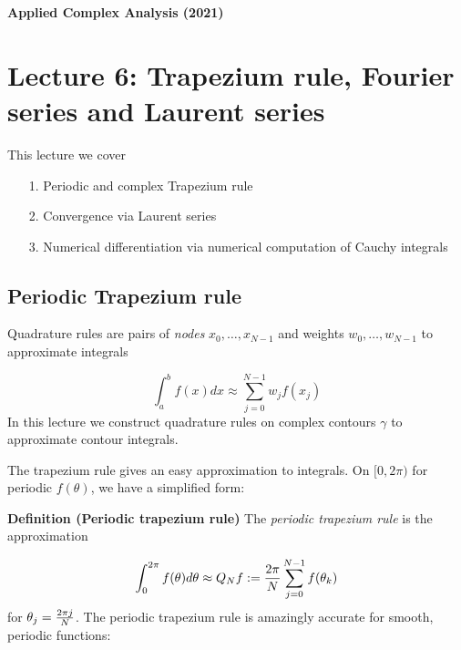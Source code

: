 \documentclass[12pt,landscape]{article}
\begin{document}
{\LARGE
\sf
\textbf{Applied Complex Analysis (2021)}

\section{Lecture 6: Trapezium rule, Fourier series and Laurent series}
This lecture we cover

\begin{itemize}
\item[1. ] Periodic and complex Trapezium rule


\item[2. ] Convergence via Laurent series


\item[3. ] Numerical differentiation via numerical computation of Cauchy integrals

\end{itemize}
\newpage
\subsection{Periodic Trapezium rule}
Quadrature rules are pairs of \emph{nodes} $x_0,\ldots,x_{N-1}$ and weights $w_0,\ldots,w_{N-1}$ to approximate integrals

\[
\int_a^b f(x) dx \approx \sum_{j=0}^{N-1} w_j f(x_j)
\]
In this lecture we construct quadrature rules on complex contours $\gamma$ to approximate contour integrals.

The trapezium rule gives an easy approximation to integrals. On $[0,2\pi)$ for periodic $f(\theta)$, we have a simplified form:

\textbf{Definition (Periodic trapezium rule)} The \emph{periodic trapezium rule} is the approximation

\[
\int_0^{2 \pi} f(\theta) d \theta \approx Q_N f := {2\pi \over N} \sum_{j=0}^{N-1} f(\theta_k)
\]
for $\theta_j = {2 \pi j \over N}$.
\newpage
The periodic trapezium rule is amazingly accurate for smooth, periodic functions:


}
\end{document}
